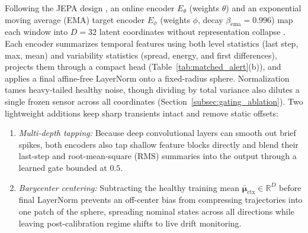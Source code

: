 \documentclass[journal]{IEEEtran}
\begin{document}
Following the JEPA design \cite{lecun2022path}, an online encoder $E_\theta$ (weights $\theta$) and an exponential moving average (EMA) target encoder $E_\phi$ (weights $\phi$, decay $\beta_{\text{ema}}=0.996$) map each window into $D=32$ latent coordinates without representation collapse \cite{grill2020bootstrap, assran2023self}. Each encoder summarizes temporal features using both level statistics (last step, max, mean) and variability statistics (spread, energy, and first differences), projects them through a compact head (Table~\ref{tab:matched_alert}(b)), and applies a final affine-free LayerNorm onto a fixed-radius sphere. Normalization tames heavy-tailed healthy noise, though dividing by total variance also dilutes a single frozen sensor across all coordinates (Section~\ref{subsec:gating_ablation}). Two lightweight additions keep sharp transients intact and remove static offsets:
\begin{enumerate}[leftmargin=*,nosep,itemsep=1pt]
    \item \emph{Multi-depth tapping:} Because deep convolutional layers can smooth out brief spikes, both encoders also tap shallow feature blocks directly and blend their last-step and root-mean-square (RMS) summaries into the output through a learned gate bounded at $0.5$.
    \item \emph{Barycenter centering:} Subtracting the healthy training mean $\bar{\bm{\mu}}_{\text{ctx}} \in \mathbb{R}^D$ before final LayerNorm prevents an off-center bias from compressing trajectories into one patch of the sphere, spreading nominal states across all directions while leaving post-calibration regime shifts to live drift monitoring.
\end{enumerate}
\end{document}
